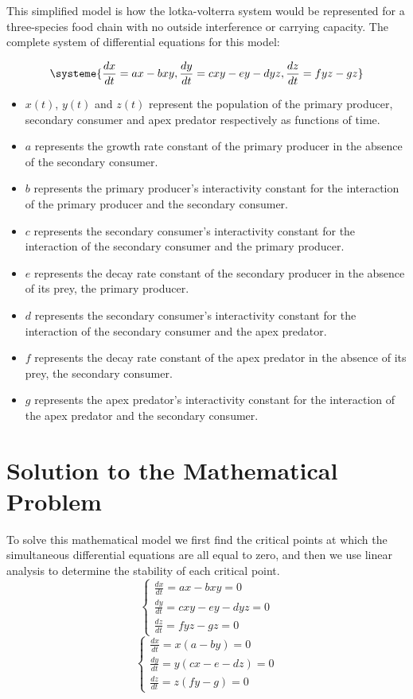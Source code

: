 \documentclass[11pt,oneside]{article}
\begin{document}
	This simplified model is how the lotka-volterra system would be represented for a three-species food chain with no outside interference or carrying capacity. The complete system of differential equations for this model:
	
	\begin{equation}
	\systeme{
		\frac{dx}{dt} = ax - bxy,
		\frac{dy}{dt} = cxy - ey -dyz,
		\frac{dz}{dt} = fyz - gz
	}
	\end{equation}
	\begin{itemize}
		\item $x(t)$, $y(t)$ and $z(t)$ represent the population of the primary producer, secondary consumer and apex predator respectively as functions of time.
		\item $a$ represents the growth rate constant of the primary producer in the absence of the secondary consumer.
		\item $b$ represents the primary producer's interactivity constant for the interaction of the primary producer and the secondary consumer.
		\item $c$ represents the secondary consumer's interactivity constant for the interaction of the secondary consumer and the primary producer.
		\item $e$ represents the decay rate constant of the secondary producer in the absence of its prey, the primary producer.
		\item $d$ represents the secondary consumer's interactivity constant for the interaction of the secondary consumer and the apex predator.
		\item $f$ represents the decay rate constant of the apex predator in the absence of its prey, the secondary consumer.
		\item $g$ represents the apex predator's interactivity constant for the interaction of the apex predator and the secondary consumer.
	\end{itemize}
	
	
	\section{Solution to the Mathematical Problem}
	To solve this mathematical model we first find the critical points at which the simultaneous differential equations are all equal to zero, and then we use linear analysis to determine the stability of each critical point. 
	\begin{equation}
	\begin{cases}
	\frac{dx}{dt} = ax - bxy = 0\\
	\frac{dy}{dt} = cxy - ey -dyz = 0\\
	\frac{dz}{dt} = fyz - gz = 0
	\end{cases}
	\end{equation}
	\begin{equation}
	\begin{cases}
	\frac{dx}{dt} = x(a-by) = 0\\
	\frac{dy}{dt} = y(cx - e -dz) = 0\\
	\frac{dz}{dt} = z(fy - g) = 0
	\end{cases}
	\end{equation}
	
\end{document}
